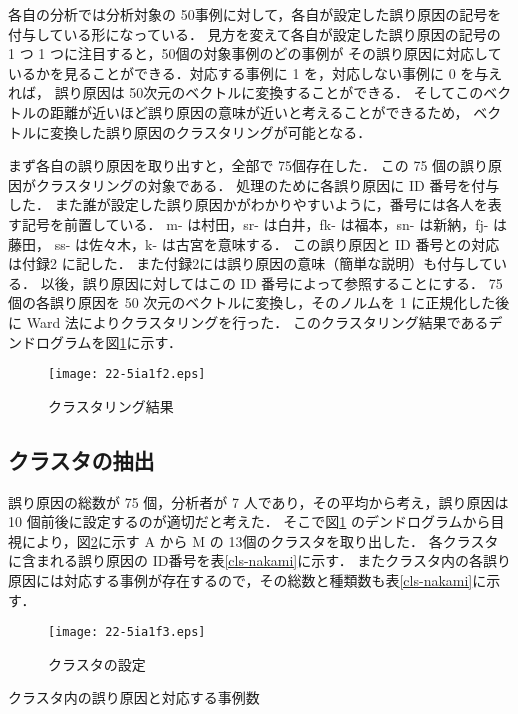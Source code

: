 \documentclass[japanese]{jnlp_1.4}
\begin{document}
各自の分析では分析対象の 50事例に対して，各自が設定した誤り原因の記号を付与している形になっている．
見方を変えて各自が設定した誤り原因の記号の 1 つ 1 つに注目すると，50個の対象事例のどの事例が
その誤り原因に対応しているかを見ることができる．対応する事例に 1 を，対応しない事例に 0 を与えれば，
誤り原因は 50次元のベクトルに変換することができる．
そしてこのベクトルの距離が近いほど誤り原因の意味が近いと考えることができるため，
ベクトルに変換した誤り原因のクラスタリングが可能となる．

まず各自の誤り原因を取り出すと，全部で 75個存在した．
この 75 個の誤り原因がクラスタリングの対象である．
処理のために各誤り原因に ID 番号を付与した．
また誰が設定した誤り原因かがわかりやすいように，番号には各人を表す記号を前置している．
m- は村田，sr- は白井，fk- は福本，sn- は新納，fj- は藤田，
ss- は佐々木，k- は古宮を意味する．
この誤り原因と ID 番号との対応は付録2 に記した．
また付録2には誤り原因の意味（簡単な説明）も付与している．
以後，誤り原因に対してはこの ID 番号によって参照することにする．
75 個の各誤り原因を 50 次元のベクトルに変換し，そのノルムを 1 に正規化した後に
Ward 法によりクラスタリングを行った\cite{shinnou-r-book}．
このクラスタリング結果であるデンドログラムを\mbox{図\ref{cl-kekka}}に示す．

\begin{figure}[b]
\begin{center}
\texttt{[image: 22-5ia1f2.eps]}
\end{center}
\caption{クラスタリング結果}
\label{cl-kekka}
\end{figure} 


\subsection{クラスタの抽出}

誤り原因の総数が 75 個，分析者が 7 人であり，その平均から考え，誤り原因は
10 個前後に設定するのが適切だと考えた．
そこで\mbox{図\ref{cl-kekka}} のデンドログラムから目視により，\mbox{図\ref{cl-ext}}に示す A から M の
13個のクラスタを取り出した．
各クラスタに含まれる誤り原因の ID番号を\mbox{表\ref{cls-nakami}}に示す．
またクラスタ内の各誤り原因には対応する事例が存在するので，その総数と種類数も\mbox{表\ref{cls-nakami}}に示す．

\begin{figure}[t]
\begin{center}
\texttt{[image: 22-5ia1f3.eps]}
\end{center}
\caption{クラスタの設定}
\label{cl-ext}
\end{figure} 
\begin{table}[t]
\caption{クラスタ内の誤り原因と対応する事例数}
\label{cls-nakami}

\end{table}
\end{document}
